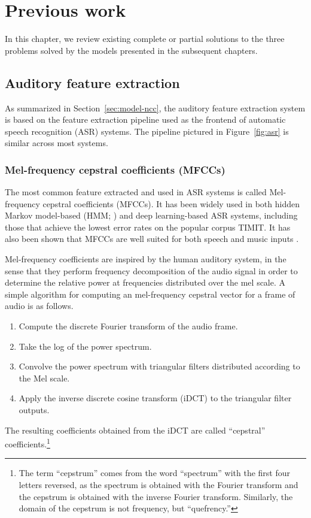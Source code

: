 \chapter{Previous work}
\label{chapt:previouswork}

In this chapter, we review
existing complete or partial solutions
to the three problems
solved by the models
presented in the subsequent chapters.

\section{Auditory feature extraction}

As summarized in Section~\ref{sec:model-ncc},
the auditory feature extraction system
is based on the feature extraction pipeline
used as the frontend
of automatic speech recognition (ASR) systems.
The pipeline pictured in Figure~\ref{fig:asr}
is similar across most systems.

\subsection{Mel-frequency cepstral coefficients (MFCCs)}
\label{sec:prev-mfcc}

The most common feature extracted
and used in ASR systems
is called Mel-frequency cepstral coefficients (MFCCs).
It has been widely used
in both hidden Markov model-based
(HMM; \cite{hain1999,gales2008,gaikwad2010})
and deep learning-based
\cite{graves2006,graves2008,fernandez2008} ASR systems,
including those that achieve
the lowest error rates
on the popular corpus TIMIT.
It has also been shown that
MFCCs are well suited
for both speech and music inputs
\cite{logan2000}.

Mel-frequency coefficients are inspired
by the human auditory system,
in the sense that they perform
frequency decomposition
of the audio signal
in order to determine the relative power
at frequencies distributed over the mel scale.
A simple algorithm for computing an
mel-frequency cepstral vector
for a frame of audio is as follows.

\begin{enumerate}
  \item Compute the discrete Fourier transform
    of the audio frame.
  \item Take the log of the power spectrum.
  \item Convolve the power spectrum
    with triangular filters distributed
    according to the Mel scale.
  \item Apply the inverse discrete cosine transform (iDCT)
    to the triangular filter outputs.
\end{enumerate}
The resulting coefficients obtained from
the iDCT are called ``cepstral'' coefficients.\footnote{
  The term ``cepstrum'' comes from
  the word ``spectrum'' with the first four letters reversed,
  as the spectrum is obtained with the Fourier transform
  and the cepstrum is obtained with the inverse Fourier transform.
  Similarly, the domain of the cepstrum is not frequency,
  but ``quefrency.''}

